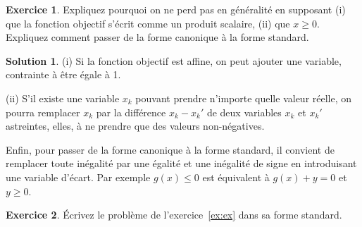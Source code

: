 \documentclass[a4paper,francais]{article}
\theoremstyle{definition}
\newtheorem{exercice}{Exercice}[section]
\newtheorem*{solution}{Solution}
\begin{document}
\begin{exercice}
  Expliquez pourquoi on ne perd pas en généralité en supposant (i)
  que la fonction objectif s'écrit comme un produit scalaire, (ii)
  que $x \geq 0$. 
  Expliquez comment passer de la forme canonique à la forme standard.
\end{exercice}

\begin{solution}
  (i) Si la fonction objectif est affine, on peut ajouter une variable,
  contrainte à être égale à 1. 
  
  (ii) S'il existe une variable $x_k$ pouvant prendre n'importe quelle valeur réelle,
  on pourra remplacer $x_k$ par la différence $x_k - x_k'$ de deux variables
  $x_k$ et $x_k'$ astreintes, elles, à ne prendre que des valeurs non-négatives.

  Enfin, pour passer de la forme canonique à la forme standard, il convient de remplacer
  toute inégalité par une égalité et une inégalité de signe
  en introduisant une variable d'écart. Par exemple $g(x) \leq 0$ est équivalent
  à $g(x) + y = 0$ et $y \geq 0$.
\end{solution}

\begin{exercice}
\'Ecrivez le problème de l'exercice~\ref{ex:ex} dans sa forme standard.
\end{exercice}
\end{document}
